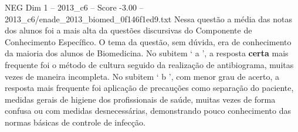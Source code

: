 \begin{textsample}{NEG Dim 1 – 2013\_c6 – Score -3.00 – 2013\_c6/enade\_2013\_biomed\_0f146f1ed9.txt}
Nessa questão a média das notas dos alunos foi a mais alta da questões discursivas do Componente de Conhecimento Específico.
O tema da questão, sem dúvida, era de conhecimento da maioria dos alunos de Biomedicina.
No subitem ‘ a ’, a resposta \textbf{certa} mais frequente foi o método de cultura seguido da realização de antibiograma, muitas vezes de maneira incompleta.
No subitem ‘ b ’, com menor grau de acerto, a resposta mais frequente foi aplicação de precauções como separação do paciente, medidas gerais de higiene dos profissionais de saúde, muitas vezes de forma confusa ou com medidas desnecessárias, demonstrando pouco conhecimento das normas básicas de controle de infecção.

\end{textsample}
